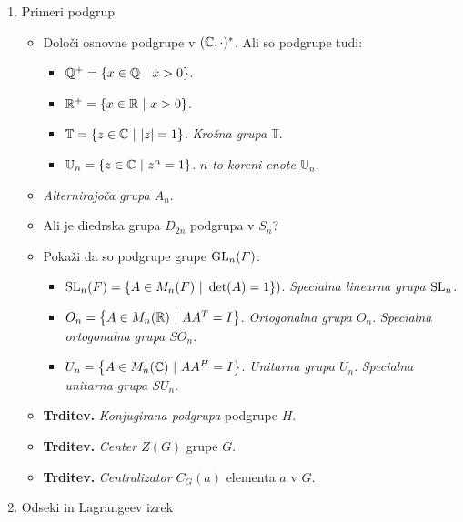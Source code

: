 \begin{enumerate}
    \newpage
    \item Primeri podgrup
    \begin{itemize}
        \item Določi osnovne podgrupe v $(\mathbb{C}, \cdot)^*$. Ali so podgrupe tudi:
        \begin{itemize}
            \item $\mathbb{Q}^+ = \left\{x \in \mathbb{Q} \ | \ x > 0\right\}$.
            \item $\mathbb{R}^+ = \left\{x \in \mathbb{R} \ | \ x > 0\right\}$.
            \item $\mathbb{T} = \left\{z \in \mathbb{C} \ | \ |z| = 1\right\}$. \emph{Krožna grupa $\mathbb{T}$}.
            \item $\mathbb{U}_n = \left\{z \in \mathbb{C} \ | \ z^n = 1\right\}$. \emph{$n$-to koreni enote $\mathbb{U}_n$}.
        \end{itemize}
        \item \emph{Alternirajoča grupa $A_n$}.
        \item Ali je diedrska grupa $D_{2n}$ podgrupa v $S_n$?
        \item Pokaži da so podgrupe grupe $\operatorname{GL}_n(F)$:
        \begin{itemize}
            \item $\operatorname{SL}_n(F) = \left\{A \in M_n(F) \ | \ \det(A) = 1\right\})$. \emph{Specialna linearna grupa $\operatorname{SL}_n$}.
            \item $O_n = \left\{A \in M_n(\mathbb{R}) \ | \ AA^T = I\right\}$. \emph{Ortogonalna grupa $O_n$}. \emph{Specialna ortogonalna grupa $SO_n$}.
            \item $U_n = \left\{A \in M_n(\mathbb{C}) \ | \ AA^H = I\right\}$. \emph{Unitarna grupa $U_n$}. \emph{Specialna unitarna grupa $SU_n$}.
        \end{itemize}
        \item \colorbox{blue!30}{\textbf{Trditev.}} \emph{Konjugirana podgrupa} podgrupe $H$.
        \item \colorbox{blue!30}{\textbf{Trditev.}} \emph{Center $Z(G)$} grupe $G$.
        \item \colorbox{blue!30}{\textbf{Trditev.}} \emph{Centralizator $C_G(a)$} elementa $a$ v $G$.
    \end{itemize}

    \item Odseki in Lagrangeev izrek
    

\end{enumerate}
